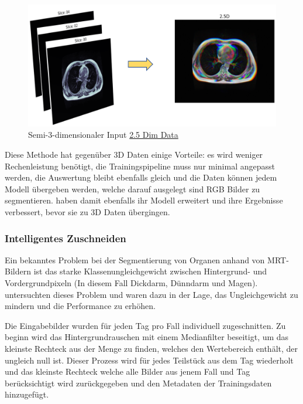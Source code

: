 \begin{figure}[H]
	\begin{center}
		\includegraphics[width=350pt]{bilder/25d_input}
		\caption{Semi-3-dimensionaler Input \href{https://www.kaggle.com/competitions/uw-madison-gi-tract-image-segmentation/discussion/322549}{2.5 Dim Data}}\label{Fig:25d-data}
	\end{center}
\end{figure}

Diese Methode hat gegenüber 3D Daten einige Vorteile: es wird weniger Rechenleistung benötigt, die Trainingspipeline muss nur minimal angepasst werden, die Auswertung bleibt ebenfalls gleich und die Daten können jedem Modell übergeben werden, welche darauf ausgelegt sind RGB Bilder zu segmentieren. \cite{Chen_2020} haben damit ebenfalls ihr Modell erweitert und ihre Ergebnisse verbessert, bevor sie zu 3D Daten übergingen.

\subsubsection{Intelligentes Zuschneiden} \label{ssec:intellicrop}

Ein bekanntes Problem bei der Segmentierung von Organen anhand von MRT-Bildern ist das starke Klassenungleichgewicht zwischen Hintergrund- und Vordergrundpixeln (In diesem Fall Dickdarm, Dünndarm und Magen). \citet{SmartCrop} untersuchten dieses Problem und waren dazu in der Lage, das Ungleichgewicht zu mindern und die Performance zu erhöhen. 

Die Eingabebilder wurden für jeden Tag pro Fall individuell zugeschnitten. Zu beginn wird das Hintergrundrauschen mit einem Medianfilter beseitigt, um das kleinste Rechteck aus der Menge zu finden, welches den Wertebereich enthält, der ungleich null ist. Dieser Prozess wird für jedes Teilstück aus dem Tag wiederholt und das kleinste Rechteck welche alle Bilder aus jenem Fall und Tag berücksichtigt wird zurückgegeben und den Metadaten der Trainingsdaten hinzugefügt.

